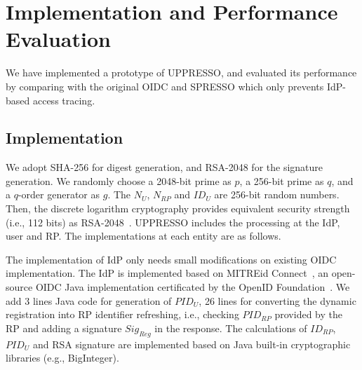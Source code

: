\section{Implementation and Performance Evaluation}
\label{sec:implementation}
We have implemented a prototype of UPPRESSO, and evaluated its performance by comparing with the original OIDC and SPRESSO which only prevents IdP-based access tracing.

\subsection{Implementation}
We adopt SHA-256 for digest generation, and  RSA-2048 for the signature generation. %
We randomly choose a 2048-bit prime as $p$, a 256-bit prime as $q$, and a  $q$-order generator as $g$. The  $N_U$, $N_{RP}$ and $ID_U$  are 256-bit random numbers. Then, the discrete logarithm cryptography  provides equivalent security strength (i.e., 112 bits) as RSA-2048~\cite{barkerecommendation}.
UPPRESSO includes the processing at the IdP, user and RP. The implementations at each entity are as follows.

The implementation of IdP only needs small modifications on existing OIDC implementation. The IdP is implemented based on MITREid Connect~\cite{MITREid}, an open-source OIDC Java implementation certificated by the OpenID Foundation~\cite{OIDF}.
We add 3 lines Java code for generation of $PID_U$, 26 lines for converting the dynamic registration into RP identifier refreshing, i.e., checking $PID_{RP}$ provided by the RP and adding a signature $Sig_{Reg}$ in the response.  %
The calculations of $ID_{RP}$, $PID_U$ and RSA signature are implemented based on Java built-in cryptographic libraries (e.g., BigInteger).

